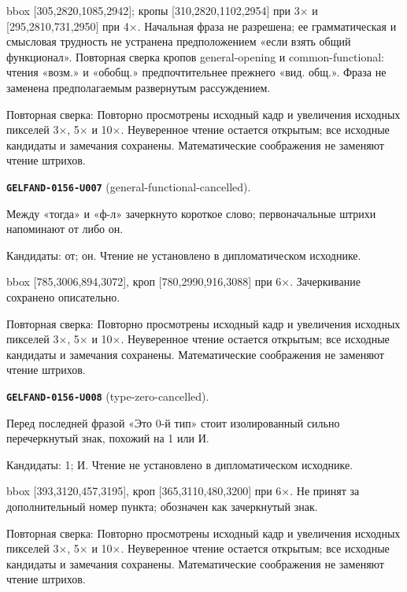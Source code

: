 bbox [305,2820,1085,2942]; кропы [310,2820,1102,2954] при 3× и [295,2810,731,2950] при 4×. Начальная фраза не разрешена; ее грамматическая и смысловая трудность не устранена предположением «если взять общий функционал». Повторная сверка кропов general-opening и common-functional: чтения «возм.» и «обобщ.» предпочтительнее прежнего «вид. общ.». Фраза не заменена предполагаемым развернутым рассуждением.\par
Повторная сверка: Повторно просмотрены исходный кадр и увеличения исходных пикселей 3×, 5× и 10×. Неуверенное чтение остается открытым; все исходные кандидаты и замечания сохранены. Математические соображения не заменяют чтение штрихов.\par\medskip
\par\noindent\leavevmode{}\label{GELFAND-0156-U007}\label{GELFAND-P001438:general-functional-cancelled}\textbf{\texttt{GELFAND-0156-U007}} (general-functional-cancelled).\nopagebreak[4]\par
Между «тогда» и «ф-л» зачеркнуто короткое слово; первоначальные штрихи напоминают от либо он.\par
Кандидаты: от; он. Чтение не установлено в дипломатическом исходнике.\par
bbox [785,3006,894,3072], кроп [780,2990,916,3088] при 6×. Зачеркивание сохранено описательно.\par
Повторная сверка: Повторно просмотрены исходный кадр и увеличения исходных пикселей 3×, 5× и 10×. Неуверенное чтение остается открытым; все исходные кандидаты и замечания сохранены. Математические соображения не заменяют чтение штрихов.\par\medskip
\par\noindent\leavevmode{}\label{GELFAND-0156-U008}\label{GELFAND-P001438:type-zero-cancelled}\textbf{\texttt{GELFAND-0156-U008}} (type-zero-cancelled).\nopagebreak[4]\par
Перед последней фразой «Это 0-й тип» стоит изолированный сильно перечеркнутый знак, похожий на 1 или И.\par
Кандидаты: 1; И. Чтение не установлено в дипломатическом исходнике.\par
bbox [393,3120,457,3195], кроп [365,3110,480,3200] при 6×. Не принят за дополнительный номер пункта; обозначен как зачеркнутый знак.\par
Повторная сверка: Повторно просмотрены исходный кадр и увеличения исходных пикселей 3×, 5× и 10×. Неуверенное чтение остается открытым; все исходные кандидаты и замечания сохранены. Математические соображения не заменяют чтение штрихов.\par\medskip

